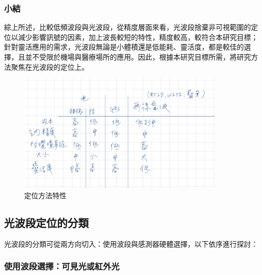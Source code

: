     \subsubsection{小結}

        
        
        綜上所述，比較低頻波段與光波段，從精度層面來看，光波段捨棄非可視範圍的定位以減少影響訊號的因素，加上波長較短的特性，精度較高，較符合本研究目標；針對靈活應用的需求，光波段無論是小體積還是低能耗、靈活度，都是較佳的選擇，且並不受限於機場與醫療場所的應用。因此，根據本研究目標所需，將研究方法聚焦在光波段的定位上。

        \begin{figure}[ht]
            \centering
            \includegraphics[width=10cm]{ch2pic/method_compare.jpg}
            \caption{定位方法特性}
            \label{pic:method_compare}
        \end{figure}

    \subsection{光波段定位的分類}

        

        光波段的分類可從兩方向切入：使用波段與感測器硬體選擇，以下依序進行探討：

        \subsubsection{使用波段選擇：可見光或紅外光}

